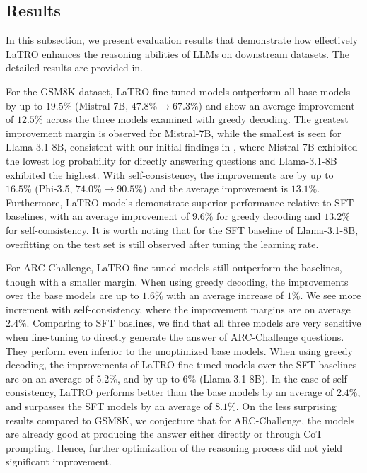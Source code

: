 \subsection{Results}
\label{sec:results}

In this subsection, we present evaluation results that demonstrate how effectively LaTRO enhances the reasoning abilities of LLMs on downstream datasets. The detailed results are provided in.

For the GSM8K dataset, LaTRO fine-tuned models outperform all base models by up to $19.5\%$ (Mistral-7B, $47.8\%\rightarrow 67.3\%$) and show an average improvement of $12.5\%$ across the three models examined with greedy decoding. The greatest improvement margin is observed for Mistral-7B, while the smallest is seen for Llama-3.1-8B, consistent with our initial findings in , where Mistral-7B exhibited the lowest log probability for directly answering questions and Llama-3.1-8B exhibited the highest. With self-consistency, the improvements are by up to $16.5\%$ (Phi-3.5, $74.0\% \rightarrow 90.5\%$) and the average improvement is $13.1\%$. Furthermore, LaTRO models demonstrate superior performance relative to SFT baselines, with an average improvement of $9.6\%$ for greedy decoding and $13.2\%$ for self-consistency. It is worth noting that for the SFT baseline of Llama-3.1-8B, overfitting on the test set is still observed after tuning the learning rate.

For ARC-Challenge, LaTRO fine-tuned models still outperform the baselines, though with a smaller margin. When using greedy decoding, the improvements over the base models are up to $1.6\%$ with an average increase of $1\%$. We see more increment with self-consistency, where the improvement margins are on average $2.4\%$. Comparing to SFT baslines, we find that all three models are very sensitive when fine-tuning to directly generate the answer of ARC-Challenge questions. They perform even inferior to the unoptimized base models. When using greedy decoding, the improvements of LaTRO fine-tuned models over the SFT baselines are on an average of $5.2\%$, and by up to $6\%$ (Llama-3.1-8B). In the case of self-consistency, LaTRO performs better than the base models by an average of $2.4\%$, and surpasses the SFT models by an average of $8.1\%$.
On the less surprising results compared to GSM8K, we conjecture that for ARC-Challenge, the models are already good at producing the answer either directly or through CoT prompting. Hence, further optimization of the reasoning process did not yield significant improvement.

